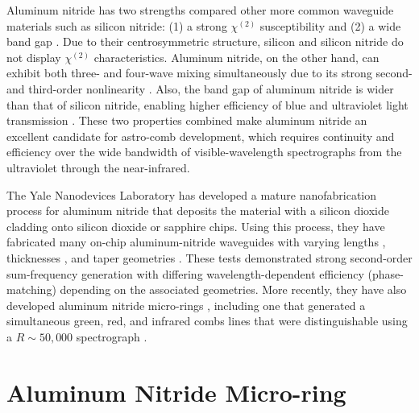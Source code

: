Aluminum nitride has two strengths compared other more common waveguide materials such as silicon nitride: (1) a strong $\chi^{(2)}$ susceptibility and (2) a wide band gap \citep{jung_aluminum_2016}. Due to their centrosymmetric structure, silicon and silicon nitride do not display $\chi^{(2)}$ characteristics. Aluminum nitride, on the other hand, can exhibit both three- and four-wave mixing simultaneously due to its strong second- and third-order nonlinearity \citep{bruch_17_2018}. Also, the band gap of aluminum nitride is wider than that of silicon nitride, enabling higher efficiency of blue and ultraviolet light transmission \citep{liu_beyond_2019}. These two properties combined make aluminum nitride an excellent candidate for astro-comb development, which requires continuity and efficiency over the wide bandwidth of visible-wavelength spectrographs from the ultraviolet through the near-infrared.

The Yale Nanodevices Laboratory has developed a mature nanofabrication process for aluminum nitride that deposits the material with a silicon dioxide cladding onto silicon dioxide or sapphire chips. Using this process, they have fabricated many on-chip aluminum-nitride waveguides with varying lengths \citep[300~\si{\micro\meter}--3~\si{\centi\meter};][]{xiong_aluminum_2012}, thicknesses \citep[330--1500~\si{\nano\meter};][]{pernice_second_2012}, and taper geometries \citep{liu_beyond_2019}. These tests demonstrated strong second-order sum-frequency generation with differing wavelength-dependent efficiency (phase-matching) depending on the associated geometries. More recently, they have also developed aluminum nitride micro-rings \citep{jung_optical_2013, guo_second-harmonic_2016}, including one that generated a simultaneous green, red, and infrared combs lines that were distinguishable using a $R \sim 50,000$ spectrograph \citep{jung_green_2014}.

\section{Aluminum Nitride Micro-ring} \label{astro-comb:micro-ring}

